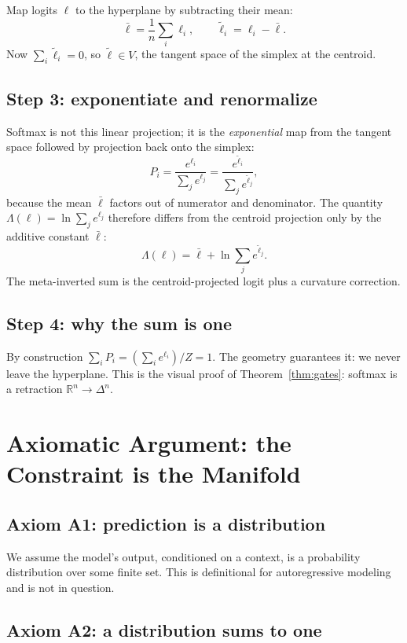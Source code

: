\documentclass[11pt]{article}
\newcommand{\simplex}[1]{\Delta^{#1}}
\newcommand{\RR}{\mathbb{R}}
\begin{document}
Map logits $\ell$ to the hyperplane by subtracting their mean:
\[
\bar\ell = \frac{1}{n}\sum_i \ell_i,\qquad
\tilde\ell_i = \ell_i - \bar\ell.
\]
Now $\sum_i \tilde\ell_i = 0$, so $\tilde\ell\in V$, the tangent space of the
simplex at the centroid.

\subsection{Step 3: exponentiate and renormalize}
\label{sec:geo-step3}

Softmax is not this linear projection; it is the \emph{exponential} map from the
tangent space followed by projection back onto the simplex:
\[
P_i = \frac{e^{\ell_i}}{\sum_j e^{\ell_j}}
     = \frac{e^{\tilde\ell_i}}{\sum_j e^{\tilde\ell_j}},
\]
because the mean $\bar\ell$ factors out of numerator and denominator. The
quantity $\Lambda(\ell) = \ln\sum_j e^{\ell_j}$ therefore differs from the
centroid projection only by the additive constant $\bar\ell$:
\[
\Lambda(\ell) = \bar\ell + \ln\sum_j e^{\tilde\ell_j}.
\]
The meta-inverted sum is the centroid-projected logit plus a curvature
correction.

\subsection{Step 4: why the sum is one}
\label{sec:geo-step4}

By construction $\sum_i P_i = (\sum_i e^{\ell_i})/Z = 1$. The geometry
guarantees it: we never leave the hyperplane. This is the visual proof of
Theorem~\ref{thm:gates}: softmax is a retraction $\RR^n\to\simplex{n}$.

\section{Axiomatic Argument: the Constraint is the Manifold}
\label{sec:axiomatic}

\subsection{Axiom A1: prediction is a distribution}
\label{sec:ax1}

We assume the model's output, conditioned on a context, is a probability
distribution over some finite set. This is definitional for autoregressive
modeling and is not in question.

\subsection{Axiom A2: a distribution sums to one}
\label{sec:ax2}
\end{document}
